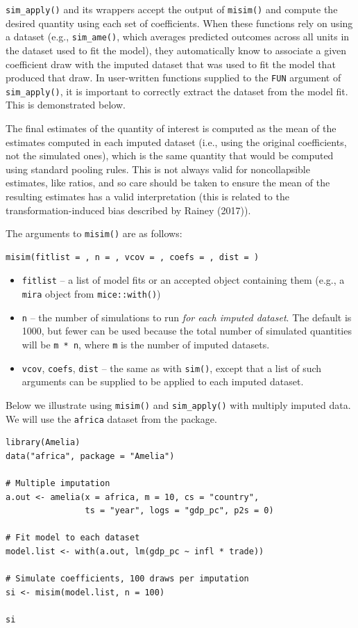 \texttt{sim\_apply()} and its wrappers accept the output of \texttt{misim()} and compute the desired quantity using each set of coefficients. When these functions rely on using a dataset (e.g., \texttt{sim\_ame()}, which averages predicted outcomes across all units in the dataset used to fit the model), they automatically know to associate a given coefficient draw with the imputed dataset that was used to fit the model that produced that draw. In user-written functions supplied to the \texttt{FUN} argument of \texttt{sim\_apply()}, it is important to correctly extract the dataset from the model fit. This is demonstrated below.

The final estimates of the quantity of interest is computed as the mean of the estimates computed in each imputed dataset (i.e., using the original coefficients, not the simulated ones), which is the same quantity that would be computed using standard pooling rules. This is not always valid for noncollapsible estimates, like ratios, and so care should be taken to ensure the mean of the resulting estimates has a valid interpretation (this is related to the transformation-induced bias described by Rainey (2017)).

The arguments to \texttt{misim()} are as follows:

\begin{verbatim}
misim(fitlist = , n = , vcov = , coefs = , dist = )
\end{verbatim}

\begin{itemize}
\item
  \texttt{fitlist} -- a list of model fits or an accepted object containing them (e.g., a \texttt{mira} object from \texttt{mice::with()})
\item
  \texttt{n} -- the number of simulations to run \emph{for each imputed dataset}. The default is 1000, but fewer can be used because the total number of simulated quantities will be \texttt{m\ *\ n}, where \texttt{m} is the number of imputed datasets.
\item
  \texttt{vcov}, \texttt{coefs}, \texttt{dist} -- the same as with \texttt{sim()}, except that a list of such arguments can be supplied to be applied to each imputed dataset.
\end{itemize}

Below we illustrate using \texttt{misim()} and \texttt{sim\_apply()} with multiply imputed data. We will use the \texttt{africa} dataset from the  package.

\begin{verbatim}
library(Amelia)
data("africa", package = "Amelia")

# Multiple imputation
a.out <- amelia(x = africa, m = 10, cs = "country",
                ts = "year", logs = "gdp_pc", p2s = 0)

# Fit model to each dataset
model.list <- with(a.out, lm(gdp_pc ~ infl * trade))

# Simulate coefficients, 100 draws per imputation
si <- misim(model.list, n = 100)

si
\end{verbatim}

